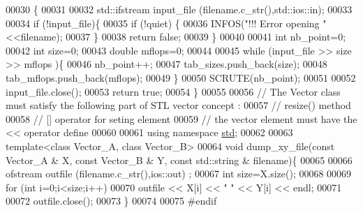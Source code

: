 \begin{DoxyCode}
00030 \{
00031 
00032   std::ifstream input\_file (filename.c\_str(),std::ios::in);
00033 
00034   \textcolor{keywordflow}{if} (!input\_file)\{
00035     \textcolor{keywordflow}{if} (!quiet) \{
00036       INFOS(\textcolor{stringliteral}{"!!! Error opening "}<<filename);
00037     \}
00038     \textcolor{keywordflow}{return} \textcolor{keyword}{false};
00039   \}
00040 
00041   \textcolor{keywordtype}{int} nb\_point=0;
00042   \textcolor{keywordtype}{int} size=0;
00043   \textcolor{keywordtype}{double} mflops=0;
00044 
00045   \textcolor{keywordflow}{while} (input\_file >> size >> mflops )\{
00046     nb\_point++;
00047     tab\_sizes.push\_back(size);
00048     tab\_mflops.push\_back(mflops);
00049   \}
00050   SCRUTE(nb\_point);
00051 
00052   input\_file.close();
00053   \textcolor{keywordflow}{return} \textcolor{keyword}{true};
00054 \}
00055 
00056 \textcolor{comment}{// The Vector class must satisfy the following part of STL vector concept :}
00057 \textcolor{comment}{//            resize() method}
00058 \textcolor{comment}{//            [] operator for seting element}
00059 \textcolor{comment}{// the vector element must have the << operator define}
00060 
00061 \textcolor{keyword}{using namespace }\hyperlink{namespacestd}{std};
00062 
00063 \textcolor{keyword}{template}<\textcolor{keyword}{class} Vector\_A, \textcolor{keyword}{class} Vector\_B>
00064 \textcolor{keywordtype}{void} dump\_xy\_file(\textcolor{keyword}{const} Vector\_A & X, \textcolor{keyword}{const} Vector\_B & Y, \textcolor{keyword}{const} std::string & filename)\{
00065   
00066   ofstream outfile (filename.c\_str(),ios::out) ;
00067   \textcolor{keywordtype}{int} size=X.size();
00068   
00069   \textcolor{keywordflow}{for} (\textcolor{keywordtype}{int} i=0;i<size;i++)
00070     outfile << X[i] << \textcolor{stringliteral}{" "} << Y[i] << endl;
00071 
00072   outfile.close();
00073 \} 
00074 
00075 \textcolor{preprocessor}{#endif}
\end{DoxyCode}

